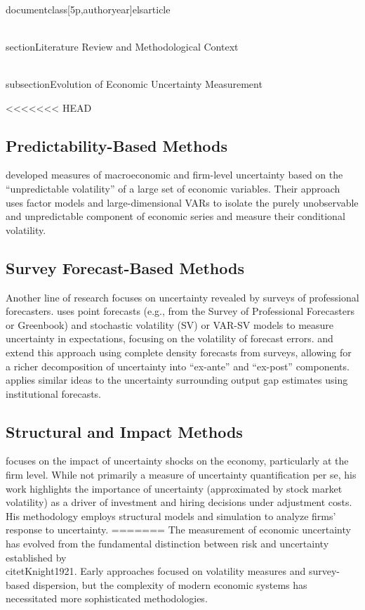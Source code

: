 \\documentclass[5p,authoryear]{elsarticle}
\begin{document}
{\\section{Literature Review and Methodological Context}

\\subsection{Evolution of Economic Uncertainty Measurement}

<<<<<<< HEAD
\subsection*{Predictability-Based Methods}
\cite{jurado2015} developed measures of macroeconomic and firm-level uncertainty based on the ``unpredictable volatility'' of a large set of economic variables. Their approach uses factor models and large-dimensional VARs to isolate the purely unobservable and unpredictable component of economic series and measure their conditional volatility.

\subsection*{Survey Forecast-Based Methods}
Another line of research focuses on uncertainty revealed by surveys of professional forecasters. \cite{clark2017} uses point forecasts (e.g., from the Survey of Professional Forecasters or Greenbook) and stochastic volatility (SV) or VAR-SV models to measure uncertainty in expectations, focusing on the volatility of forecast errors. \cite{carriero2018} and \cite{rossi2016} extend this approach using complete density forecasts from surveys, allowing for a richer decomposition of uncertainty into ``ex-ante'' and ``ex-post'' components. \cite{berge2020} applies similar ideas to the uncertainty surrounding output gap estimates using institutional forecasts.

\subsection*{Structural and Impact Methods}
\cite{bloomuncer} focuses on the impact of uncertainty shocks on the economy, particularly at the firm level. While not primarily a measure of uncertainty quantification per se, his work highlights the importance of uncertainty (approximated by stock market volatility) as a driver of investment and hiring decisions under adjustment costs. His methodology employs structural models and simulation to analyze firms' response to uncertainty.
=======
The measurement of economic uncertainty has evolved from the fundamental distinction between risk and uncertainty established by \\citet{Knight1921}. Early approaches focused on volatility measures and survey-based dispersion, but the complexity of modern economic systems has necessitated more sophisticated methodologies.

}
\end{document}
